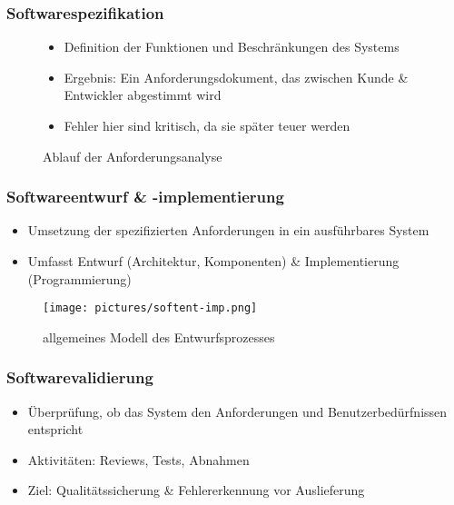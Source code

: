 \documentclass[12pt,a4paper,oneside]{article}
\begin{document}
\subsubsection{Softwarespezifikation}

\begin{figure}[H]
\begin{minipage}[t]{0.45\textwidth}
\begin{itemize}
\item Definition der Funktionen und Beschränkungen des Systems
\item Ergebnis: Ein Anforderungsdokument, das zwischen Kunde \& Entwickler abgestimmt wird
\item Fehler hier sind kritisch, da sie später teuer werden
\end{itemize}
\end{minipage}
\hfill
\begin{minipage}[t]{0.45\textwidth}
\centering
\vspace{-15mm}
\caption{Ablauf der Anforderungsanalyse}
\end{minipage}
\end{figure}

\newpage

\subsubsection{Softwareentwurf \& -implementierung}

\begin{itemize}
\item Umsetzung der spezifizierten Anforderungen in ein ausführbares System
\item Umfasst Entwurf (Architektur, Komponenten) \& Implementierung (Programmierung)
\end{itemize}

\begin{figure}[H]
\centering
\texttt{[image: pictures/softent-imp.png]}
\caption{allgemeines Modell des Entwurfsprozesses}
\end{figure}

\subsubsection{Softwarevalidierung}
\begin{itemize}
\item Überprüfung, ob das System den Anforderungen und Benutzerbedürfnissen entspricht
\item Aktivitäten: Reviews, Tests, Abnahmen
\item Ziel: Qualitätssicherung \& Fehlererkennung vor Auslieferung
\end{itemize}
\end{document}
